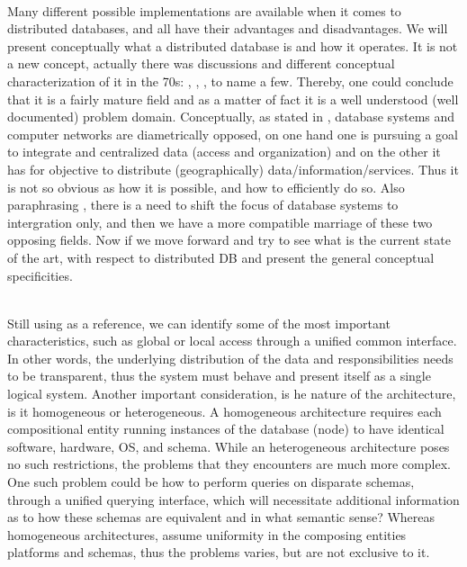 \documentclass[11pt]{amsart}
\begin{document}
\begin{enumarate}
          \\ Many different possible implementations are available when it comes to
          distributed databases, and all have their advantages and disadvantages. We will
          present conceptually what a distributed database is and how it operates. It is
          not a new concept, actually there was discussions and different conceptual
          characterization of it in the 70s: \cite{codd1970relational},
          \cite{linders1976distributed}, \cite{draffan1980distributed}, to name a
          few. Thereby, one could conclude that it is a fairly mature field and as a
          matter of fact it is a well understood (well documented) problem
          domain. Conceptually, as stated in \cite{ozsu2011principles}, database systems
          and computer networks are diametrically opposed, on one hand one is pursuing a
          goal to integrate and centralized data (access and organization) and on the
          other it has for objective to distribute (geographically)
          data/information/services. Thus it is not so obvious as how it is possible, and
          how to efficiently do so. Also paraphrasing \cite{ozsu2011principles}, there is
          a need to shift the focus of database systems to intergration only, and then we
          have a more compatible marriage of these two opposing fields. Now if we move
          forward and try to see what is the current state of the art, with respect to
          distributed DB and present the general conceptual specificities.
          
          \\ Still using \cite{ozsu2011principles} as a reference, we can identify some of
          the most important characteristics, such as global or local access through a
          unified common interface. In other words, the underlying distribution of the
          data and responsibilities needs to be transparent, thus the system must behave
          and present itself as a single logical system. Another important consideration,
          is he nature of the architecture, is it homogeneous or heterogeneous. A
          homogeneous architecture requires each compositional entity running instances of
          the database (node) to have identical software, hardware, OS, and schema. While
          an heterogeneous architecture poses no such restrictions, the problems that they
          encounters are much more complex. One such problem could be how to perform
          queries on disparate schemas, through a unified querying interface, which will
          necessitate additional information as to how these schemas are equivalent and in
          what semantic sense? Whereas homogeneous architectures, assume uniformity in the
          composing entities platforms and schemas, thus the problems varies, but are not
          exclusive to it.


\end{enumarate}
\end{document}
